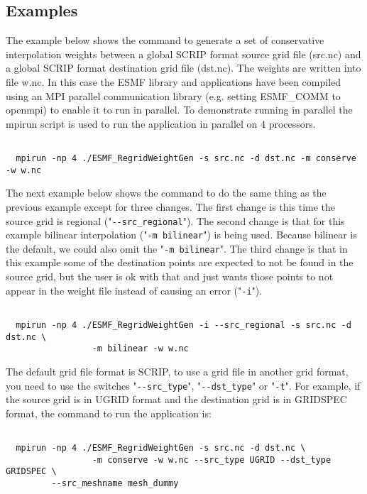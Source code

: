 \subsection{Examples}

The example below shows the command to generate a set of conservative interpolation weights between a global 
SCRIP format source grid file (src.nc) and a global SCRIP format destination grid file (dst.nc). The weights
are written into file w.nc. In this case the
ESMF library and applications have been compiled using an MPI parallel communication library 
(e.g. setting ESMF\_COMM to openmpi) to enable it to run in parallel. To demonstrate running in parallel
the mpirun script is used to run the application in parallel on 4 processors. 

\begin{verbatim}

  mpirun -np 4 ./ESMF_RegridWeightGen -s src.nc -d dst.nc -m conserve -w w.nc

\end{verbatim}

The next example below shows the command to do the same thing as the previous example except for three changes. The first 
change is this time the source grid is regional ("{\tt \verb+--+src\_regional}"). The second change is that
for this example bilinear interpolation ("{\tt -m bilinear}") is being used. Because bilinear is the default, we could also
omit the "{\tt -m bilinear}". The third change is that in this example some of the destination points are expected to
not be found in the source grid, but the user is ok with that and just wants those points to not appear in the weight file instead of causing an error ("{\tt -i}"). 

\begin{verbatim}

  mpirun -np 4 ./ESMF_RegridWeightGen -i --src_regional -s src.nc -d dst.nc \
                 -m bilinear -w w.nc

\end{verbatim}

The default grid file format is SCRIP, to use a grid file in another grid format, you 
need to use the switches "{\tt \verb+--+src\_type}", "{\tt \verb+--+dst\_type}" or "{\tt -t}".  For example, if the 
source grid is in UGRID format and the destination grid is in GRIDSPEC format, the command 
to run the application is:

\begin{verbatim}

  mpirun -np 4 ./ESMF_RegridWeightGen -s src.nc -d dst.nc \
                 -m conserve -w w.nc --src_type UGRID --dst_type GRIDSPEC \
		 --src_meshname mesh_dummy

\end{verbatim}
 
